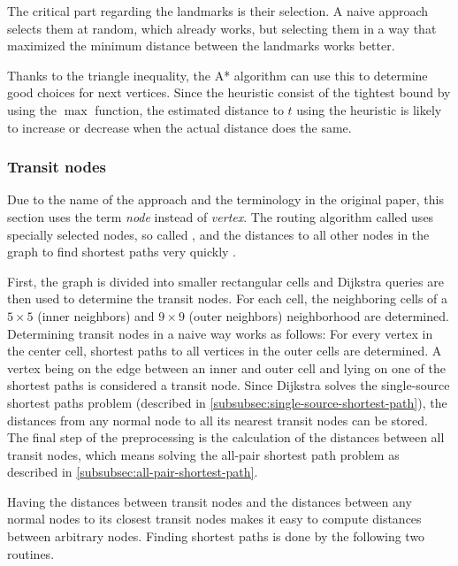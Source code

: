 			The critical part regarding the landmarks is their selection.
			A naive approach selects them at random, which already works, but selecting them in a way that maximized the minimum distance between the landmarks works better.
			
			Thanks to the triangle inequality, the A* algorithm can use this to determine good choices for next vertices.
			Since the heuristic consist of the tightest bound by using the $\max$ function, the estimated distance to $t$ using the heuristic is likely to increase or decrease when the actual distance does the same.
		
		\subsubsection{Transit nodes}
		\label{subsubsec:transit}
		
			Due to the name of the approach and the terminology in the original paper, this section uses the term \emph{node} instead of \emph{vertex}.
			The routing algorithm called  uses specially selected nodes, so called , and the distances to all other nodes in the graph to find shortest paths very quickly \cite{bast-transit}.
		
			First, the graph is divided into smaller rectangular cells and Dijkstra queries are then used to determine the transit nodes.
			For each cell, the neighboring cells of a $5 \times 5$ (inner neighbors) and $9 \times 9$ (outer neighbors) neighborhood are determined.
			Determining transit nodes in a naive way works as follows:
			For every vertex in the center cell, shortest paths to all vertices in the outer cells are determined.
			A vertex being on the edge between an inner and outer cell and lying on one of the shortest paths is considered a transit node.
			Since Dijkstra solves the single-source shortest paths problem (described in \cref{subsubsec:single-source-shortest-path}), the distances from any normal node to all its nearest transit nodes can be stored.
			The final step of the preprocessing is the calculation of the distances between all transit nodes, which means solving the all-pair shortest path problem as described in \cref{subsubsec:all-pair-shortest-path}.
			
			Having the distances between transit nodes and the distances between any normal nodes to its closest transit nodes makes it easy to compute distances between arbitrary nodes.
			Finding shortest paths is done by the following two routines.
			
